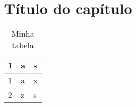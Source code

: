 \chapter{\sc Título do capítulo}
\lipsum[2-4] \cite{kopka2004guide}\lipsum[1]
\begin{table}[]
\centering
\caption{Minha tabela}
\label{my-label}
\begin{tabular}{lll}
1 & a & s \\ \hline
1 & a & x \\
2 & z & s
\end{tabular}
\end{table}

